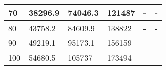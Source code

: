 \begin{table}[h]
\begin{tabular}{|l|l|l|l|l|l|}
70                                                                         & 38296.9                              & 74046.3                               & 121487                                & -                                     & -                                     \\ \hline
80                                                                         & 43758.2                              & 84609.9                               & 138822                                & -                                     & -                                     \\ \hline
90                                                                         & 49219.1                              & 95173.1                               & 156159                                & -                                     & -                                     \\ \hline
100                                                                        & 54680.5                              & 105737                                & 173494                                & -                                     & -                                     \\ \hline
\end{tabular}
\end{table}

